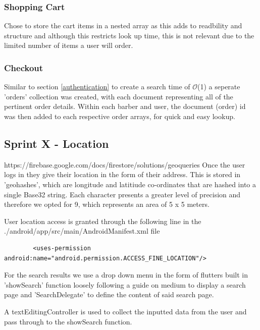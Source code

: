 \documentclass[12pt]{article}
\begin{document}
	\subsubsection{Shopping Cart}
	Chose to store the cart items in a nested array as this adds to readbility and structure and although this restricts look up time, this is not relevant due to the limited number of items a user will order.
	
	\subsubsection{Checkout}
	Similar to section \ref{authentication} to create a search time of $\mathcal{O}$(1) a seperate 'orders' collection was created, with each document representing all of the pertinent order details. Within each barber and user, the document (order) id was then added to each respective order arrays, for quick and easy lookup.
	
	\subsection{Sprint X - Location}
	https://firebase.google.com/docs/firestore/solutions/geoqueries
	Once the user logs in they give their location in the form of their address. This is stored in 'geohashes', which are longitude and latitiude co-ordinates that are hashed into a single Base32 string. Each character presents a greater level of precision and therefore we opted for 9, which represents an area of 5 x 5 meters.
	
	User location access is granted through the following line in the ./android/app/src/main/AndroidManifest.xml file
	\begin{lstlisting}
		<uses-permission android:name="android.permission.ACCESS_FINE_LOCATION"/>
	\end{lstlisting}
	For the search results we use a drop down menu in the form of flutters built in 'showSearch' function loosely following a guide on medium \cite{sheanLocationSearchAutocomplete2020} to display a search page and 'SearchDelegate' to define the content of said search page.
	
	A textEditingController is used to collect the inputted data from the user and pass through to the showSearch function.
	
	\noindent
	
	
	
\end{document}
